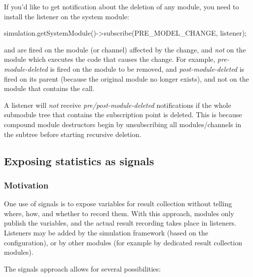 If you'd like to get notification about the deletion of any module, you need
to install the listener on the system module:

\begin{cpp}
simulation.getSystemModule()->subscribe(PRE_MODEL_CHANGE, listener);
\end{cpp}

\begin{note}
   and  are fired on the
  module (or channel) affected by the change, and \textit{not} on the module
  which executes the code that causes the change. For example,
  \textit{pre-module-deleted} is fired on the module to be removed, and
  \textit{post-module-deleted} is fired on its parent (because the original
  module no longer exists), and not on the module that contains the
   call.
\end{note}

\begin{note}
  A listener will \textit{not} receive \textit{pre/post-module-deleted}
  notifications if the whole submodule tree that contains the subscription
  point is deleted. This is because compound module destructors begin
  by unsubscribing all modules/channels in the subtree before starting
  recursive deletion.
\end{note}


\subsection{Exposing statistics as signals}

\subsubsection{Motivation}

One use of signals is to expose variables for result collection without
telling where, how, and whether to record them. With this approach,
modules only publish the variables, and the actual result recording
takes place in listeners. Listeners may be added by the simulation
framework (based on the configuration), or by other modules (for example
by dedicated result collection modules).

The signals approach allows for several possibilities:


